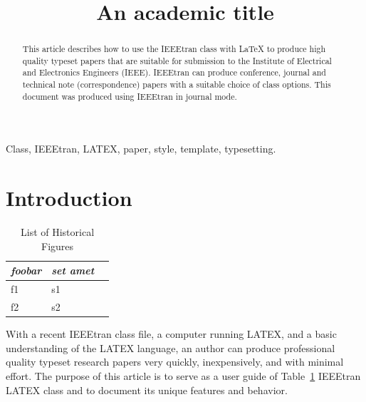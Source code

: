 \documentclass[10pt,conference,compsocconf]{IEEEtran}
\begin{document}

\title{\textbf{\Large An academic title}\\[0.2ex]}

\author{
\and
{}
\IEEEauthorblockA{}}
\maketitle

\begin{abstract}
This article describes how to use the IEEEtran class with LaTeX to produce high
quality typeset papers that are suitable for submission to the Institute of
Electrical and Electronics Engineers (IEEE). IEEEtran can produce conference,
journal and technical note (correspondence) papers with a suitable choice of
class options. This document was produced using IEEEtran in journal mode.
\end{abstract}

\begin{IEEEkeywords}
Class, IEEEtran, LATEX, paper, style, template, typesetting.
\end{IEEEkeywords}

\section{Introduction}
\label{introduction}

\begin{table}[htbp]
\caption{List of Historical Figures}
\label{historicalFigures}
\centering
\begin{tabular}{lll}
\hline
\textit{foobar} & \textit{set amet} \\
\hline
f1 & s1\\
f2 & s2\\
\hline
\end{tabular}
\end{table}

With a recent IEEEtran class file, a computer running LATEX, and a basic
understanding of the LATEX language, an author can produce professional quality
typeset research papers very quickly, inexpensively, and with minimal effort.
The purpose of this article is to serve as a user guide of Table~\ref{historicalFigures}
IEEEtran LATEX class and to document its unique features and behavior.
\end{document}
